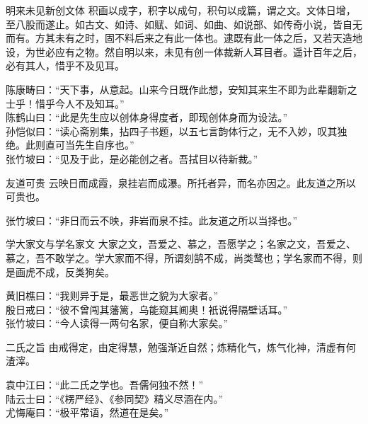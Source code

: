 \begin{yulu}{明来未见新创文体}
积画以成字，积字以成句，积句以成篇，谓之文。文体日增，至八股而遂止。如古文、如诗、如赋、如词、如曲、如说部、如传奇小说，皆自无而有。方其未有之时，固不料后来之有此一体也。逮既有此一体之后，又若天造地设，为世必应有之物。然自明以来，未见有创一体裁新人耳目者。遥计百年之后，必有其人，惜乎不及见耳。
\begin{comments}
陈康畴曰：“天下事，从意起。山来今日既作此想，安知其来生不即为此辈翻新之士乎！惜乎今人不及知耳。” \\
陈鹤山曰：“此是先生应以创体身得度者，即现创体身而为设法。” \\
孙恺似曰：“读心斋别集，拈四子书题，以五七言韵体行之，无不入妙，叹其独绝。此则直可当先生自序也。” \\
张竹坡曰：“见及于此，是必能创之者。吾拭目以待新裁。”
\end{comments}
\end{yulu}

\begin{yulu}{友道可贵}
云映日而成霞，泉挂岩而成瀑。所托者异，而名亦因之。此友道之所以可贵也。
\begin{comments}
张竹坡曰：“非日而云不映，非岩而泉不挂。此友道之所以当择也。”
\end{comments}
\end{yulu}

\begin{yulu}{学大家文与学名家文}
大家之文，吾爱之、慕之，吾愿学之；名家之文，吾爱之、慕之，吾不敢学之。学大家而不得，所谓刻鹄不成，尚类鹜也；学名家而不得，则是画虎不成，反类狗矣。
\begin{comments}
黄旧樵曰：“我则异于是，最恶世之貌为大家者。” \\
殷日戒曰：“彼不曾闯其藩篱，乌能窥其阃奥！衹说得隔壁话耳。” \\
张竹坡曰：“今人读得一两句名家，便自称大家矣。”
\end{comments}
\end{yulu}

\begin{yulu}{二氏之旨}
由戒得定，由定得慧，勉强渐近自然；炼精化气，炼气化神，清虚有何渣滓。
\begin{comments}
袁中江曰：“此二氏之学也。吾儒何独不然！” \\
陆云士曰：“《楞严经》、《参同契》精义尽涵在内。” \\
尤悔庵曰：“极平常语，然道在是矣。”
\end{comments}
\end{yulu}


